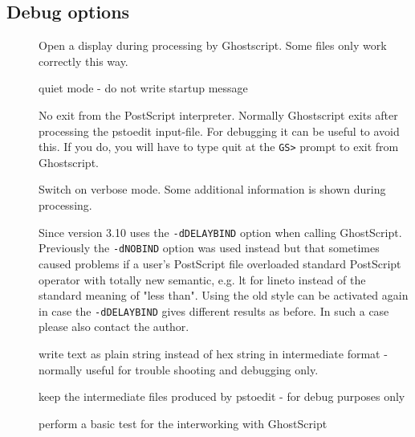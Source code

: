 \documentclass[english,a4paper]{article}
\begin{document}
\subsection{Debug options}
\begin{description}
\item[] 
Open a display during processing by Ghostscript. Some files only work correctly this way. 


\item[] 
quiet mode - do not write startup message


\item[] 
No exit from the PostScript interpreter. Normally Ghostscript exits after processing the pstoedit input-file. For debugging it can be useful to avoid this. If you do, you will have to type quit at the \verb+GS>+ prompt to exit from Ghostscript.   


\item[] 
Switch on verbose mode. Some additional information is shown during processing. 


\item[] 
Since version 3.10  uses the \texttt{-dDELAYBIND} option when calling GhostScript. Previously the \texttt{-dNOBIND} option was used instead but that sometimes caused problems if a user's PostScript file overloaded standard PostScript operator with totally new semantic, e.g. lt for lineto instead of the standard meaning of "less than". Using  the old style can be activated again in case the \texttt{-dDELAYBIND} gives different results as before. In such a case please also contact the author. 


\item[] 
write text as plain string instead of hex string in intermediate format - normally useful for trouble shooting and debugging only.


\item[] 
keep the intermediate files produced by pstoedit - for debug purposes only


\item[] 
perform a basic test for the interworking with GhostScript


\end{description}
\end{document}

